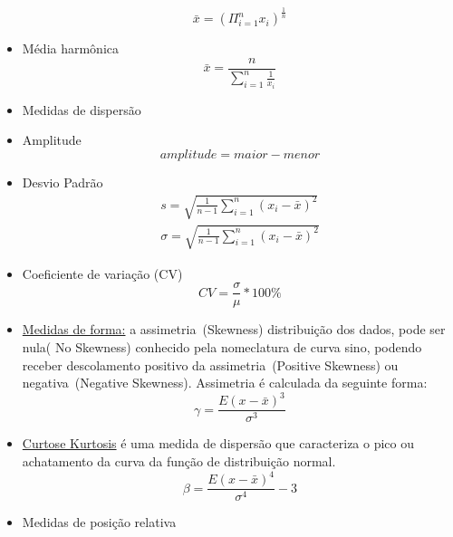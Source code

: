 \begin{itemize}
\begin{equation}
              \bar{x} = (\Pi^n_{i=1} x_i)^{\frac{1}{n}}
          \end{equation}
    \item Média harmônica
          \begin{equation} \label{eq:media_harmonica}
              \bar{x} = \frac{n}{\sum^{n}_{i=1} \frac{1}{x_i}}
          \end{equation}
    \item Medidas de dispersão
    \item Amplitude
          \begin{equation} \label{eq:amplitude}
              amplitude = maior - menor
          \end{equation}
    \item Desvio Padrão
          \begin{equation} \label{eq:desvio_padrao}
              \begin{split}
                  s = \sqrt{\frac{1}{n-1} \sum^n_{i=1} (x_i - \bar{x})^2}
                  \\
                  \sigma = \sqrt{\frac{1}{n-1} \sum^n_{i=1} (x_i - \bar{x})^2}
              \end{split}
          \end{equation}
    \item Coeficiente de variação (CV)
          \begin{equation} \label{eq:coeficiente_variacao}
              CV = \frac{\sigma}{\mu} * 100\%
          \end{equation}
    \item \underline{Medidas de forma:}
          a assimetria~(Skewness) distribuição dos dados, pode ser nula( No Skewness) conhecido pela nomeclatura de curva sino, podendo receber descolamento positivo da assimetria~(Positive Skewness) ou negativa~(Negative Skewness).
          Assimetria é calculada da seguinte forma:
          \begin{equation} \label{eq:medidas_forma}
              \gamma = \frac{E(x - \bar{x})^3}{\sigma^3}
          \end{equation}
    \item \underline{Curtose Kurtosis}
          é uma medida de dispersão que caracteriza o pico ou achatamento da curva da função de distribuição normal.
          \begin{equation} \label{eq:curtose_kurtosis}
              \beta = \frac{E(x - \bar{x})^4}{\sigma^4}  -3
          \end{equation}
    \item Medidas de posição relativa

\end{itemize}
